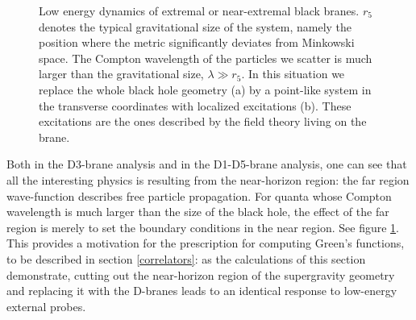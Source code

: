 \begin{figure}[htb]
\begin{center}
\epsfxsize=3.5in\leavevmode{}
\end{center}
\caption{ Low energy dynamics of extremal or near-extremal black branes. 
$r_5$ denotes the typical gravitational size of the system, namely
the position where the metric significantly deviates from 
Minkowski space. The Compton wavelength of 
the particles we scatter is much larger than the gravitational size,
$ \lambda \gg r_5$. In this situation we replace the whole black 
hole geometry (a)  by a point-like system in the transverse coordinates 
 with localized excitations (b).
These excitations are the ones described by the field theory living on
the brane. 
}
\label{nature}
\end{figure} 

Both
in the D3-brane analysis and in the D1-D5-brane analysis, one can see that
all the interesting physics is resulting from the near-horizon region: the
far region wave-function describes free particle propagation.  For quanta
whose Compton wavelength is much larger than the size of the black hole,
the effect of the far region is merely to set the boundary conditions in
the near region. See figure \ref{nature}. 
This provides a motivation for the prescription for
computing Green's functions, to be described in
section \ref{correlators}: as the calculations of this section
demonstrate, cutting out the near-horizon region of the supergravity
geometry and replacing it with the D-branes leads to an identical response
to low-energy external probes.

